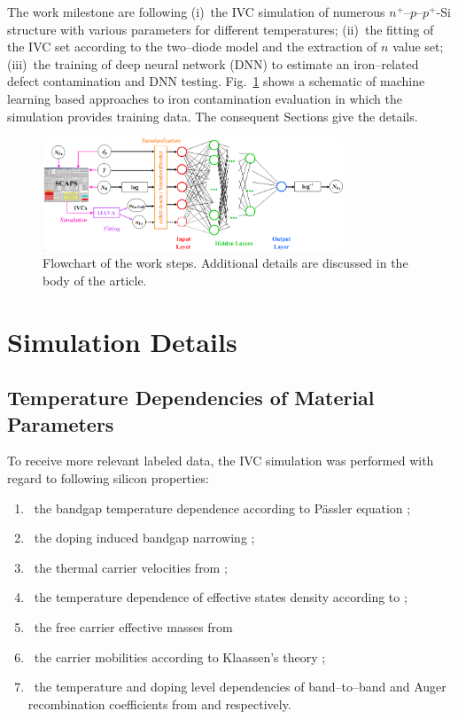 \documentclass[journal]{IEEEtran}
\begin{document}
The work milestone are following
(i)~the IVC simulation of numerous $n^+$--$p$--$p^+$-Si structure with various parameters for different temperatures;
(ii)~the fitting of the IVC set according to the two--diode model and the extraction of $n$ value set;
(iii)~the training of deep neural network (DNN) to estimate an iron--related defect contamination  and DNN testing.
Fig.~\ref{fig_chem} shows a schematic of machine learning based approaches to iron contamination evaluation in which the simulation provides training data.
The consequent Sections give the details.

\begin{figure}[tb]
\centering
\includegraphics[width=0.8\textwidth]{Chem}
\caption{Flowchart of the work  steps.
Additional details are discussed in the body of the article.}
\label{fig_chem}
\end{figure}


\section{Simulation Details}

\subsection{Temperature Dependencies of Material Parameters}

To receive more relevant labeled data, the IVC simulation was performed with regard to following silicon properties:
\begin{enumerate}
  \item~the bandgap temperature dependence according to P\"assler equation \cite{Pasler};
  \item~the doping induced bandgap narrowing \cite{EgNarrow};
  \item~the thermal carrier velocities from \cite{Nc:Green};
  \item~the temperature dependence of effective states density  according to \cite{Si_ni_Couderc};
  \item~the free carrier effective masses from \cite{OMara}
  \item~the carrier mobilities according to Klaassen's theory  \cite{KLAASSEN953};
  \item~the temperature and doping level dependencies of band--to--band and Auger recombination coefficients from \cite{Si_BtB} and \cite{Si_Auger} respectively.
\end{enumerate}
\end{document}
